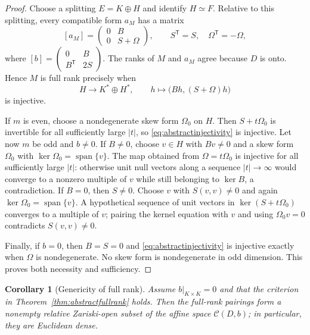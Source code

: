 \documentclass[11pt,a4paper]{article}
\newtheorem{corollary}[theorem]{Corollary}
\theoremstyle{definition}
\theoremstyle{remark}
\newcommand{\Ker}{\operatorname{ker}}
\newcommand{\spanof}{\operatorname{span}}
\newcommand{\cC}{\mathcal{C}}
\begin{document}
\begin{proof}
Choose a splitting $E=K\oplus H$ and identify $H\simeq F$.  Relative to this splitting,
every compatible form $a_M$ has a matrix
\begin{equation}\label{eq:abstractblockform}
 [a_M]=
 \begin{pmatrix}
  0&B\\
  0&S+\Omega
 \end{pmatrix},
 \qquad S^{\mathsf T}=S,\quad \Omega^{\mathsf T}=-\Omega,
\end{equation}
where
$[b]=\left(\begin{smallmatrix}0&B\\B^{\mathsf T}&2S\end{smallmatrix}\right)$.
The ranks of $M$ and $a_M$ agree because $D$ is onto.  Hence $M$ is full rank precisely
when
\begin{equation}\label{eq:abstractinjectivity}
 H\longrightarrow K^*\oplus H^*,
 \qquad h\longmapsto\bigl(Bh,(S+\Omega)h\bigr)
\end{equation}
is injective.

If $m$ is even, choose a nondegenerate skew form $\Omega_0$ on $H$.  Then
$S+t\Omega_0$ is invertible for all sufficiently large $|t|$, so
\eqref{eq:abstractinjectivity} is injective.  Let now $m$ be odd and $b\neq0$.  If $B\neq0$,
choose $v\in H$ with $Bv\neq0$ and a skew form $\Omega_0$ with
$\Ker\Omega_0=\spanof\{v\}$.  The map obtained from $\Omega=t\Omega_0$ is injective for
all sufficiently large $|t|$: otherwise unit null vectors along a sequence
$|t|\to\infty$ would converge to a nonzero multiple of $v$ while still belonging to
$\Ker B$, a contradiction.  If $B=0$, then $S\neq0$.  Choose $v$ with
$S(v,v)\neq0$ and again $\Ker\Omega_0=\spanof\{v\}$.  A hypothetical sequence of unit
vectors in $\Ker(S+t\Omega_0)$ converges to a multiple of $v$; pairing the kernel equation
with $v$ and using $\Omega_0v=0$ contradicts $S(v,v)\neq0$.

Finally, if $b=0$, then $B=S=0$ and \eqref{eq:abstractinjectivity} is injective exactly when
$\Omega$ is nondegenerate.  No skew form is nondegenerate in odd dimension.  This proves
both necessity and sufficiency.
\end{proof}

\begin{corollary}[Genericity of full rank]\label{cor:genericfullrank}
Assume $b|_{K\times K}=0$ and that the criterion in
Theorem~\ref{thm:abstractfullrank} holds.  Then the full-rank pairings form a nonempty
relative Zariski-open subset of the affine space $\cC(D,b)$; in particular, they are
Euclidean dense.
\end{corollary}
\end{document}
